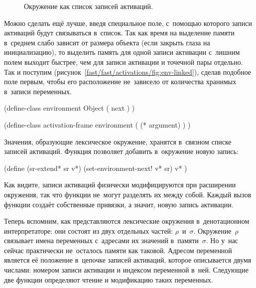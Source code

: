 \begin{figure}[ht]\begin{center}

\end{center}%
\caption{Окружение как список записей активаций.}%
\label{fast/fast/activations/fig:env-lists}%
\end{figure}

Можно сделать ещё лучше, введя специальное поле, с~помощью которого записи
активаций будут связываться в~список. Так как время на выделение памяти
в~среднем слабо зависит от размера объекта (если закрыть глаза на
инициализацию), то выделить память для одной записи активации с~лишним полем
выходит быстрее, чем для записи активации и точечной пары отдельно. Так и
поступим (рисунок~\ref{fast/fast/activations/fig:env-linked}), сделав подобное
поле первым, чтобы его расположение не~зависело от количества хранимых в~записи
переменных.

\begin{code:lisp}
(define-class environment Object
  ( next ) )

(define-class activation-frame environment
  ( (* argument) ) )
\end{code:lisp}

Значения, образующие лексическое окружение, хранятся в~связном списке записей
активаций. Функция  позволяет добавить в~окружение новую запись:

\begin{code:lisp}
(define (sr-extend* sr v*)
  (set-environment-next! v* sr)
  v* )
\end{code:lisp}

Как видите, записи активаций физически модифицируются при расширении окружения,
так что функции не~могут разделять их между собой. Каждый вызов функции создаёт
собственные привязки, а значит, новую запись активации.

Теперь вспомним, как представляются лексические окружения в~денотационном
интерпретаторе: они состоят из двух отдельных частей: $\rho$~и~$\sigma$.
Окружение~$\rho$ связывает имена переменных с~адресами их значений
в~памяти~$\sigma$. Но у~нас сейчас практически не~осталось памяти как таковой.
Адресом переменной является её положение в~цепочке записей активаций, которое
описывается двумя числами: номером записи активации и индексом переменной в~ней.
Следующие две функции определяют чтение и модификацию таких переменных.

